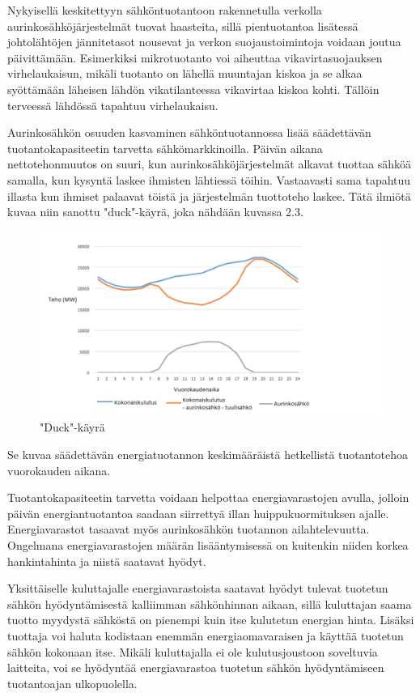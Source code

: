   Nykyisellä keskitettyyn sähköntuotantoon rakennetulla verkolla aurinkosähköjärjestelmät tuovat haasteita, sillä pientuotantoa lisätessä johtolähtöjen jännitetasot nousevat ja verkon suojaustoimintoja voidaan joutua päivittämään. Esimerkiksi mikrotuotanto voi aiheuttaa vikavirtasuojauksen virhelaukaisun, mikäli tuotanto on lähellä muuntajan kiskoa ja se alkaa syöttämään läheisen lähdön vikatilanteessa vikavirtaa kiskoa kohti. Tällöin terveessä lähdössä tapahtuu virhelaukaisu. \parencite{Mikrotuotanto}
  
  Aurinkosähkön osuuden kasvaminen sähköntuotannossa lisää säädettävän tuotantokapasiteetin tarvetta sähkömarkkinoilla. Päivän aikana nettotehonmuutos on suuri, kun aurinkosähköjärjestelmät alkavat tuottaa sähköä samalla, kun kysyntä laskee ihmisten lähtiessä töihin. Vastaavasti sama tapahtuu illasta kun ihmiset palaavat töistä ja järjestelmän tuottoteho laskee. Tätä ilmiötä kuvaa niin sanottu "duck"-käyrä, joka nähdään kuvassa 2.3. \begin{figure}
    \centering
    \includegraphics[width=1.1\textwidth]{figures/Duck_curve.png}
    \caption{"Duck"-käyrä}
  \end{figure} Se kuvaa säädettävän energiatuotannon keskimääräistä hetkellistä tuotantotehoa vuorokauden aikana. \parencite{duckCurve}

  Tuotantokapasiteetin tarvetta voidaan helpottaa energiavarastojen avulla, jolloin päivän energiantuotantoa saadaan siirrettyä illan huippukuormituksen ajalle. Energiavarastot tasaavat myös aurinkosähkön tuotannon ailahtelevuutta. Ongelmana energiavarastojen määrän lisääntymisessä on kuitenkin niiden korkea hankintahinta ja niistä saatavat hyödyt.

  Yksittäiselle kuluttajalle energiavarastoista saatavat hyödyt tulevat tuotetun sähkön hyödyntämisestä kalliimman sähkönhinnan aikaan, sillä kuluttajan saama tuotto myydystä sähköstä on pienempi kuin itse kulutetun energian hinta. Lisäksi tuottaja voi haluta kodistaan enemmän energiaomavaraisen ja käyttää tuotetun sähkön kokonaan itse. Mikäli kuluttajalla ei ole kulutusjoustoon soveltuvia laitteita, voi se hyödyntää energiavarastoa tuotetun sähkön hyödyntämiseen tuotantoajan ulkopuolella.
  
